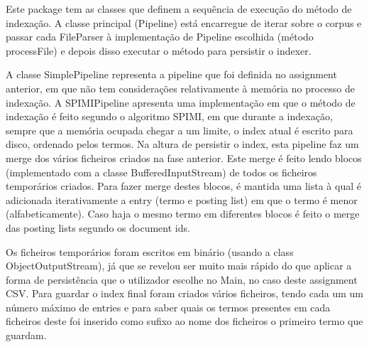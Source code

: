 \documentclass[12pt]{article}
\begin{document}
Este package tem as classes que definem a sequência de execução
do método de indexação. A classe principal (Pipeline) está encarregue
de iterar sobre o corpus e passar cada FileParser à implementação
de Pipeline escolhida (método processFile) e depois disso executar
o método para persistir o indexer.

A classe SimplePipeline representa a pipeline que foi definida no
assignment anterior, em que não tem considerações relativamente à
memória no processo de indexação. A SPIMIPipeline apresenta uma
implementação em que o método de indexação é feito segundo o
algoritmo SPIMI, em que durante a indexação, sempre que a memória
ocupada chegar a um limite, o index atual é escrito para disco, ordenado
pelos termos. Na altura de persistir o index, esta pipeline faz um merge
dos vários ficheiros criados na fase anterior. Este merge é feito lendo
blocos (implementado com a classe BufferedInputStream) de todos os
ficheiros temporários criados. Para fazer merge destes blocos, é mantida
uma lista à qual é adicionada iterativamente a entry (termo e posting
list) em que o termo é menor (alfabeticamente). Caso haja o mesmo termo
em diferentes blocos é feito o merge das posting lists segundo
os document ids.

Os ficheiros temporários foram escritos em binário (usando a class
ObjectOutputStream), já que se revelou ser muito mais rápido do que
aplicar a forma de persistência que o utilizador escolhe no Main, no
caso deste assignment CSV. Para guardar o index final foram criados
vários ficheiros, tendo cada um um número máximo de entries e para
saber quais os termos presentes em cada ficheiros deste foi inserido
como sufixo ao nome dos ficheiros o primeiro termo que guardam.

\end{document}
